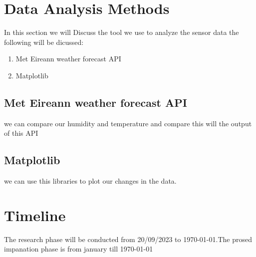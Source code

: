 \section{Data Analysis Methods}
In this section we will Discuss the tool we use to analyze the sensor data the following will be dicussed:
\begin{enumerate}
    \item Met Eireann weather forecast API
    \item Matplotlib
\end{enumerate}
\subsection{Met Eireann weather forecast API}
we can compare our humidity and temperature and compare this will the output of this  API
\subsection{Matplotlib}
we can use this libraries to plot our changes in the data.


\section{Timeline}
The research  phase will be  conducted from 20/09/2023 to \today.The prosed impanation phase is from january till \today